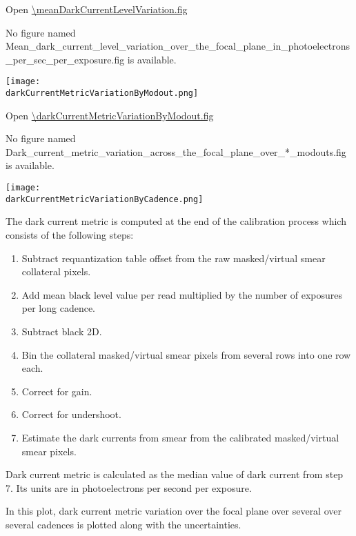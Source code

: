 Open \url{\meanDarkCurrentLevelVariation.fig}

\else
No figure named
Mean\_dark\_current\_level\_variation\_over\_the\_focal\_plane\_in\_photoelectrons\_per\_sec\_per\_exposure.fig is
available.
\fi
\clearpage

\ifdefined \darkCurrentMetricVariationByModout

\begin{center}
  \texttt{[image: \\darkCurrentMetricVariationByModout.png]}
\end{center}

\darkCurrentMetricVariationByModoutCaption

Open \url{\darkCurrentMetricVariationByModout.fig}

\else
No figure named
Dark\_current\_metric\_variation\_across\_the\_focal\_plane\_over\_*\_modouts.fig is
available.
\fi
\clearpage

\ifdefined \darkCurrentMetricVariationByCadence

\begin{center}
  \texttt{[image: \\darkCurrentMetricVariationByCadence.png]}
\end{center}

The dark current metric is computed at the end of the calibration
process which consists of the following steps:

\begin{enumerate}
\item
  Subtract requantization table offset from the raw masked/virtual smear
  collateral pixels.
\item
  Add mean black level value per read multiplied by the number of
  exposures per long cadence.
\item
  Subtract black 2D.
\item
  Bin the collateral masked/virtual smear pixels from several rows into
  one row each.
\item
  Correct for gain.
\item
  Correct for undershoot.
\item
  Estimate the dark currents from smear from the calibrated
  masked/virtual smear pixels.
\end{enumerate}

Dark current metric is calculated as the median value of dark current
from step 7. Its units are in photoelectrons per second per exposure.

In this plot, dark current metric variation over the focal plane over
several over several cadences is plotted along with the uncertainties.

